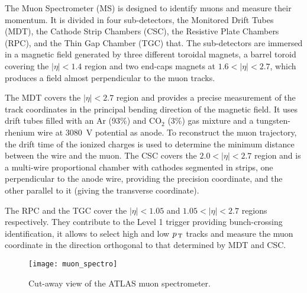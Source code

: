 The Muon Spectrometer (MS) is designed to identify muons and measure their
momentum. It is divided in four sub-detectors, the Monitored Drift Tubes (MDT),
the Cathode Strip Chambers (CSC), the Resistive Plate Chambers (RPC), and the
Thin Gap Chamber (TGC) that. The sub-detectors are immersed in a magnetic field
generated by three different toroidal magnets, a barrel toroid covering the
$|\eta| < 1.4$ region and two end-caps magnets at $1.6 < |\eta| < 2.7$, which
produces a field almost perpendicular to the muon tracks.

The MDT covers the $|\eta| < 2.7$ region and provides a precise measurement of
the track coordinates in the principal bending direction of the magnetic
field. It uses drift tubes filled with an Ar (93\%) and CO$_2$ (3\%) gas mixture
and a tungsten-rhenium wire at 3080~V potential as anode. To reconstruct the
muon trajectory, the drift time of the ionized charges is used to determine the
minimum distance between the wire and the muon. The CSC covers the $2.0 < |\eta|
< 2.7$ region and is a multi-wire proportional chamber with cathodes segmented in
strips, one perpendicular to the anode wire, providing the precision coordinate,
and the other parallel to it (giving the transverse coordinate).


The RPC and the TGC cover the $|\eta| < 1.05$ and $1.05 < |\eta| < 2.7$ regions
respectively. They contribute to the Level 1 trigger providing bunch-crossing
identification, it allows to select high and low $p_\mathrm{\, T}$ tracks and measure the
muon coordinate in the direction orthogonal to that determined by MDT and CSC.

\begin{figure}[!h]
  \centering
    \texttt{[image: muon\_spectro]}
    \caption{Cut-away view of the ATLAS muon spectrometer.}
    \label{fig:muon_spectro}
\end{figure}
